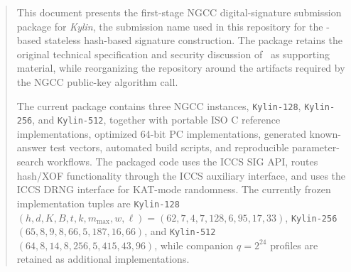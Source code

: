 \begin{abstract}
This document presents the first-stage NGCC digital-signature submission package for \emph{Kylin}, the submission name used in this repository for the \SPHINCSA-based stateless hash-based signature construction. The package retains the original technical specification and security discussion of \SPHINCSA\ as supporting material, while reorganizing the repository around the artifacts required by the NGCC public-key algorithm call.

The current package contains three NGCC instances, \texttt{Kylin-128}, \texttt{Kylin-256}, and \texttt{Kylin-512}, together with portable ISO C reference implementations, optimized 64-bit PC implementations, generated known-answer test vectors, automated build scripts, and reproducible parameter-search workflows. The packaged code uses the ICCS SIG API, routes hash/XOF functionality through the ICCS auxiliary interface, and uses the ICCS DRNG interface for KAT-mode randomness. The currently frozen implementation tuples are \texttt{Kylin-128} $(h,d,K,B,t,k,m_{\max},w,\ell)=(62,7,4,7,128,6,95,17,33)$, \texttt{Kylin-256} $(65,8,9,8,66,5,187,16,66)$, and \texttt{Kylin-512} $(64,8,14,8,256,5,415,43,96)$, while companion $q=2^{24}$ profiles are retained as additional implementations.
\end{abstract}
